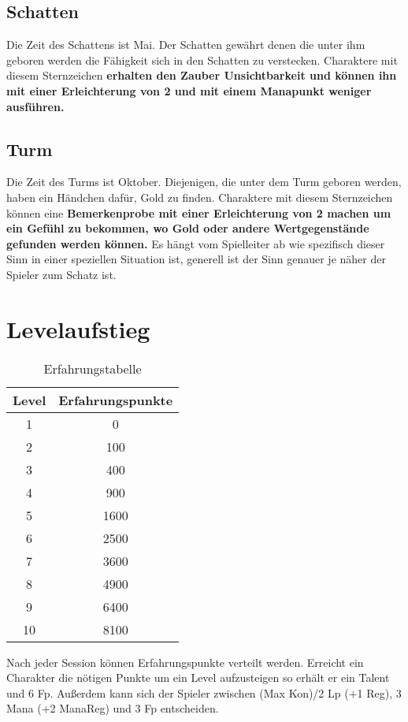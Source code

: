 \documentclass[../../Heldenanleitung2]{subfiles}
\begin{document}
\subsection{Schatten}
Die Zeit des Schattens ist Mai. Der Schatten gewährt denen die unter ihm geboren werden die Fähigkeit sich in den Schatten zu verstecken. Charaktere mit diesem Sternzeichen \textbf{erhalten den Zauber Unsichtbarkeit und können ihn mit einer Erleichterung von 2 und mit  einem Manapunkt weniger ausführen.}

\subsection{Turm}
Die Zeit des Turms ist Oktober. Diejenigen, die unter dem Turm geboren werden, haben ein Händchen dafür, Gold zu finden. Charaktere mit diesem Sternzeichen können eine \textbf{Bemerkenprobe mit einer Erleichterung von 2 machen um ein Gefühl zu bekommen, wo Gold oder andere Wertgegenstände gefunden werden können.} Es hängt vom Spielleiter ab wie spezifisch dieser Sinn in einer speziellen Situation ist, generell ist der Sinn genauer je näher der Spieler zum Schatz ist.

\section{Levelaufstieg}

\begin{wraptable}{r}{6cm}
\centering
\begin{tabular}{|c|c|}
\hline
Level & Erfahrungspunkte \\ \hline
1 & 0\\ \hline
2 & 100\\ \hline
3 & 400\\ \hline
4 & 900\\ \hline
5 & 1600\\ \hline
6 & 2500\\ \hline
7 & 3600\\ \hline
8 & 4900\\ \hline
9 & 6400\\ \hline
10 & 8100\\ \hline
\end{tabular}
\caption{Erfahrungstabelle}
\end{wraptable}
Nach jeder Session können Erfahrungspunkte verteilt werden. Erreicht ein Charakter die nötigen Punkte um ein Level aufzusteigen so erhält er ein Talent und 6 Fp. Außerdem kann sich der Spieler zwischen (Max Kon)/2 Lp (+1 Reg), 3 Mana (+2 ManaReg) und 3 Fp entscheiden.
\end{document}
